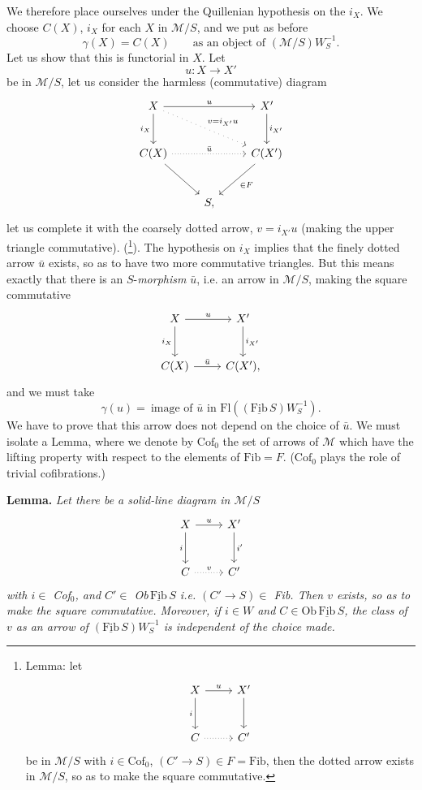 \documentclass[11pt]{article}
\newcommand{\printedpage}[1]{\marginpar{\footnotesize p.~#1}}
\newcommand{\msp}[1]{\marginpar{\footnotesize [#1]}}
\newcommand{\cM}{\mathcal{M}}
\newcommand{\Fib}{\underline{\mathrm{Fib}}\,}
\newcommand{\Fl}{\mathrm{Fl}}
\newcommand{\Ob}{\mathrm{Ob}}
\begin{document}
\msp{page 90}We therefore place ourselves under the Quillenian hypothesis on the $i_X$. We choose $C(X)$, $i_X$ for
each $X$ in $\cM/S$, and we put as before
\[
\gamma(X)=C(X) \qquad \text{as an object of $(\cM/S)W_S^{-1}$.}
\]
Let us show that this is functorial in $X$. Let
\[
u:X\longrightarrow X'
\]
be in $\cM/S$, let us consider the harmless (commutative) diagram
\[
\begin{tikzcd}[row sep=large]
X \arrow[rr, "u"] \arrow[d, "i_X"'] \arrow[drr, loosely dotted, "v=i_{X'}u"] & & X' \arrow[d, "i_{X'}"] \\
C(X) \arrow[rr, dotted, "\bar{u}"] \arrow[dr] & & C(X') \arrow[dl, "\in F"] \\
& S, &
\end{tikzcd}
\]
let us complete it with the coarsely dotted arrow, $v=i_{X'}u$ (making the upper triangle
commutative). (\footnote[54]{Lemma: let
\[
\begin{tikzcd}[ampersand replacement=\&, row sep=large]
X \arrow[r, "u"] \arrow[d, "i"'] \& X' \arrow[d] \\
C \arrow[r, dotted] \& C'
\end{tikzcd}
\]
be in $\cM/S$ with $i\in\mathrm{Cof}_0$, $(C'\longrightarrow S)\in F=\mathrm{Fib}$, then the dotted arrow exists in $\cM/S$, so as
to make the square commutative.}). The hypothesis on $i_X$ implies that the finely dotted arrow $\bar{u}$ exists,
so as to have two more commutative triangles. But this means exactly that there is
an $S$-\textit{morphism} $\bar{u}$, i.e. an arrow in $\cM/S$, making the square commutative
\printedpage{57}
\[
\begin{tikzcd}[row sep=large]
X \arrow[r, "u"] \arrow[d, "i_X"'] & X' \arrow[d, "i_{X'}"] \\
C(X) \arrow[r, "\bar{u}"] & C(X'),
\end{tikzcd}
\]
\msp{page 91}and we must take
\[
\gamma(u)=\ \text{image of $\bar{u}$ in $\Fl((\Fib S)W_S^{-1})$.}
\]
We have to prove that this arrow does not depend on the choice of $\bar{u}$. We must isolate a Lemma,
where we denote by $\mathrm{Cof}_0$ the set of arrows of $\cM$ which have %
the lifting property with
respect to the elements of $\mathrm{Fib}=F$. ($\mathrm{Cof}_0$ plays the role of trivial cofibrations.)

\textbf{Lemma.} \textit{Let there be a solid-line diagram in $\cM/S$}
\[
\begin{tikzcd}[row sep=large]
X \arrow[r, "u"] \arrow[d, "i"'] & X' \arrow[d, "i'"] \\
C \arrow[r, dotted, "v"] & C'
\end{tikzcd}
\]
\textit{with $i\in$ Cof$_0$, and $C'\in$ Ob$\,\Fib S$ i.e. $(C'\longrightarrow S)\in$ Fib. Then $v$ exists, so as to make
the square commutative. Moreover, if $i\in W$ and $C\in\Ob\,\Fib S$, the class of $v$ as an arrow of
$(\Fib S)W_S^{-1}$ is independent of the choice made.}
\end{document}
